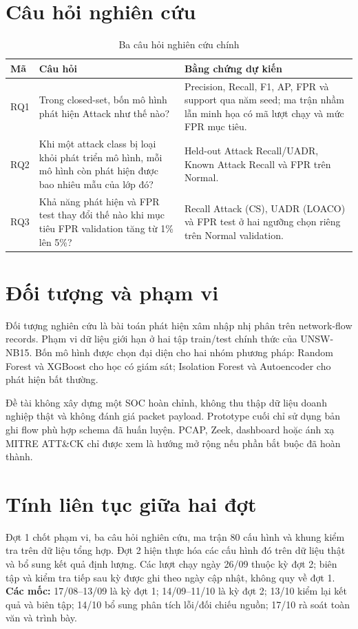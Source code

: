 \documentclass[12pt,a4paper,oneside]{report}
\begin{document}
\section{Câu hỏi nghiên cứu}

\begin{table}[H]
\centering
\caption{Ba câu hỏi nghiên cứu chính}
\label{tab:rq}
\begin{tabularx}{\textwidth}{L{1.3cm}Y Y}
\toprule
\textbf{Mã} & \textbf{Câu hỏi} & \textbf{Bằng chứng dự kiến} \\
\midrule
RQ1 & Trong closed-set, bốn mô hình phát hiện Attack như thế nào? & Precision, Recall, F1, AP, FPR và support qua năm seed; ma trận nhầm lẫn minh họa có mã lượt chạy và mức FPR mục tiêu. \\
RQ2 & Khi một attack class bị loại khỏi phát triển mô hình, mỗi mô hình còn phát hiện được bao nhiêu mẫu của lớp đó? & Held-out Attack Recall/UADR, Known Attack Recall và FPR trên Normal. \\
RQ3 & Khả năng phát hiện và FPR test thay đổi thế nào khi mục tiêu FPR validation tăng từ 1\% lên 5\%? & Recall Attack (CS), UADR (LOACO) và FPR test ở hai ngưỡng chọn riêng trên Normal validation. \\
\bottomrule
\end{tabularx}
\end{table}

\section{Đối tượng và phạm vi}

Đối tượng nghiên cứu là bài toán phát hiện xâm nhập nhị phân trên network-flow records. Phạm vi dữ liệu giới hạn ở hai tập train/test chính thức của UNSW-NB15. Bốn mô hình được chọn đại diện cho hai nhóm phương pháp: Random Forest và XGBoost cho học có giám sát; Isolation Forest và Autoencoder cho phát hiện bất thường.

Đề tài không xây dựng một SOC hoàn chỉnh, không thu thập dữ liệu doanh nghiệp thật và không đánh giá packet payload. Prototype cuối chỉ sử dụng bản ghi flow phù hợp schema đã huấn luyện. PCAP, Zeek, dashboard hoặc ánh xạ MITRE ATT\&CK chỉ được xem là hướng mở rộng nếu phần bắt buộc đã hoàn thành.


\section{Tính liên tục giữa hai đợt}
Đợt 1 chốt phạm vi, ba câu hỏi nghiên cứu, ma trận 80 cấu hình và khung kiểm tra trên dữ liệu tổng hợp. Đợt 2 hiện thực hóa các cấu hình đó trên dữ liệu thật và bổ sung kết quả định lượng. Các lượt chạy ngày 26/09 thuộc kỳ đợt 2; biên tập và kiểm tra tiếp sau kỳ được ghi theo ngày cập nhật, không quy về đợt 1.
\noindent\textbf{Các mốc:} 17/08--13/09 là kỳ đợt 1; 14/09--11/10 là kỳ đợt 2; 13/10 kiểm lại kết quả và biên tập; 14/10 bổ sung phân tích lỗi/đối chiếu nguồn; 17/10 rà soát toàn văn và trình bày.
\end{document}
